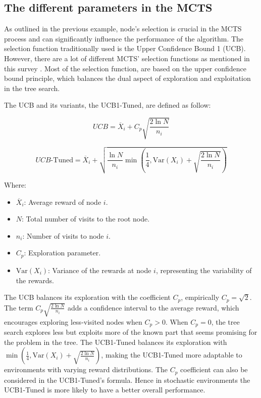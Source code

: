 \documentclass[conference]{IEEEtran}
\begin{document}
\subsection{The different parameters in the MCTS}
\label{sub:selection_policies_litterature}

As outlined in the previous example, node's selection is crucial in the MCTS process and can significantly influence the performance of the algorithm.
The selection function traditionally used is the Upper Confidence Bound 1 (UCB). However, there are a lot of different MCTS' selection functions as mentioned in this survey \cite{different_selection_policies}. Most of the selection function, are based on the upper confidence bound principle, which balances the dual aspect of exploration and exploitation in the tree search.

The UCB and its variants, the UCB1-Tuned, are defined as follow:

\begin{equation}
    UCB = \overline{X}_i + C_p \sqrt{\frac{2 \ln N}{n_i}}
    \label{eq:UCB}
\end{equation}

\begin{equation}
    UCB\text{-Tuned} = \overline{X}_i + \sqrt{\frac{\ln N}{n_i} \min\left(\frac{1}{4}, \mathrm{Var}(X_i) + \sqrt{\frac{2 \ln N}{n_i}}\right)}
    \label{eq:UCB1T}
\end{equation}

Where:
\begin{itemize}
    \item \( \overline{X}_i \): Average reward of node \( i \).
    \item \( N \): Total number of visits to the root node.
    \item \( n_i \): Number of visits to node \( i \).
    \item \( C_p \): Exploration parameter.
    \item \( \mathrm{Var}(X_i) \): Variance of the rewards at node \( i \), representing the variability of the rewards.
\end{itemize}

The UCB balances its exploration with the coefficient $C_p$, empirically $C_p=\sqrt2$. The term \( C_p \sqrt{\frac{2 \ln N}{n_i}} \) adds a confidence interval to the average reward, which encourages exploring less-visited nodes when $C_p>0$. When $C_p=0$, the tree search explores less but exploits more of the known part that seems promising for the problem in the tree.
The UCB1-Tuned balances its exploration with \( \min\left(\frac{1}{4}, \mathrm{Var}(X_i) + \sqrt{\frac{2 \ln N}{n_i}}\right) \), making the UCB1-Tuned more adaptable to environments with varying reward distributions. The $C_p$ coefficient can also be considered in the UCB1-Tuned's formula. Hence in stochastic environments the UCB1-Tuned is more likely to have a better overall performance.
\end{document}
